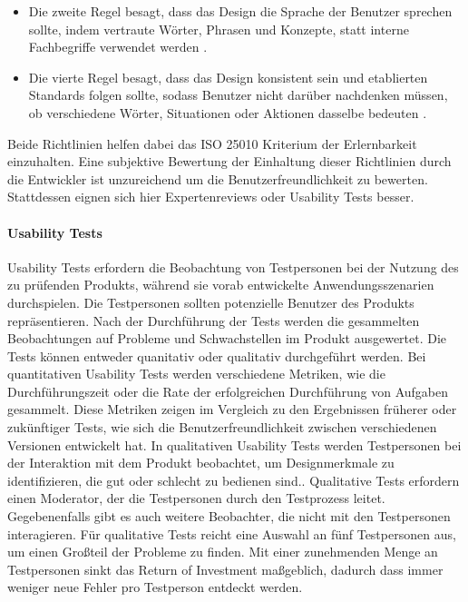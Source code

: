 \begin{itemize}
    \item Die zweite Regel besagt, dass das Design die Sprache der Benutzer sprechen sollte, indem vertraute Wörter, Phrasen und Konzepte, statt interne Fachbegriffe verwendet werden \cite[Regel 2]{Nielsen.1994}.
    \item Die vierte Regel besagt, dass das Design konsistent sein und etablierten Standards folgen sollte, sodass Benutzer nicht darüber nachdenken müssen, ob verschiedene Wörter, Situationen oder Aktionen dasselbe bedeuten \cite[Regel 4]{Nielsen.1994}.
\end{itemize}

Beide Richtlinien helfen dabei das ISO 25010 Kriterium der Erlernbarkeit einzuhalten. Eine subjektive Bewertung der Einhaltung dieser Richtlinien durch die Entwickler ist unzureichend um die Benutzerfreundlichkeit zu bewerten. Stattdessen eignen sich hier Expertenreviews oder Usability Tests besser.

\paragraph{Usability Tests}
Usability Tests erfordern die Beobachtung von Testpersonen bei der Nutzung des zu prüfenden Produkts, während sie vorab entwickelte Anwendungsszenarien durchspielen. Die Testpersonen sollten potenzielle Benutzer des Produkts repräsentieren.\cite[S.~22]{Dumas.1999} Nach der Durchführung der Tests werden die gesammelten Beobachtungen auf Probleme und Schwachstellen im Produkt ausgewertet. Die Tests können entweder quanitativ oder qualitativ durchgeführt werden. Bei quantitativen Usability Tests werden verschiedene Metriken, wie die Durchführungszeit oder die Rate der erfolgreichen Durchführung von Aufgaben gesammelt. Diese Metriken zeigen im Vergleich zu den Ergebnissen früherer oder zukünftiger Tests, wie sich die Benutzerfreundlichkeit zwischen verschiedenen Versionen entwickelt hat. In qualitativen Usability Tests werden Testpersonen bei der Interaktion mit dem Produkt beobachtet, um Designmerkmale zu identifizieren, die gut oder schlecht zu bedienen sind.\cite{Budiu.2017}. Qualitative Tests erfordern einen Moderator, der die Testpersonen durch den Testprozess leitet. Gegebenenfalls gibt es auch weitere Beobachter, die nicht mit den Testpersonen interagieren.\cite{Moran.2019} Für qualitative Tests reicht eine Auswahl an fünf Testpersonen aus, um einen Großteil der Probleme zu finden. Mit einer zunehmenden Menge an Testpersonen sinkt das Return of Investment maßgeblich, dadurch dass immer weniger neue Fehler pro Testperson entdeckt werden.\cite{Nielsen.2012}

